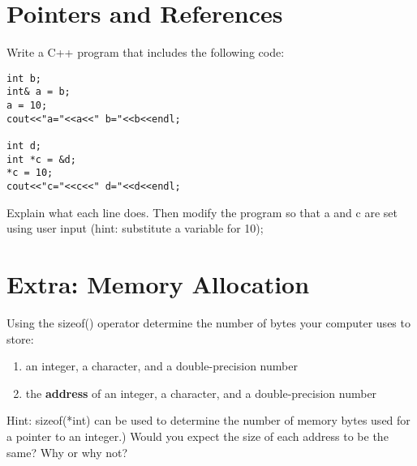 \documentclass{article}
\begin{document}
\section*{Pointers and References}
Write a C++ program that includes the following code:
\begin{lstlisting}
int b;
int& a = b;
a = 10;
cout<<"a="<<a<<" b="<<b<<endl;

int d;
int *c = &d;
*c = 10;
cout<<"c="<<c<<" d="<<d<<endl;
\end{lstlisting}
Explain what each line does. Then modify the program so that a and c are set using user input (hint: substitute a variable for 10); 

\section*{Extra: Memory Allocation}
Using the sizeof() operator determine the number of bytes your computer uses to store:
\begin{enumerate}
	\item an integer, a character, and a double-precision number
	\item the \textbf{address} of an integer, a character, and a double-precision number
\end{enumerate}
Hint: sizeof(*int) can be used to determine the number of memory bytes used for a pointer to an integer.) Would you expect the size of each address to be the same? Why or why not?
\end{document}
